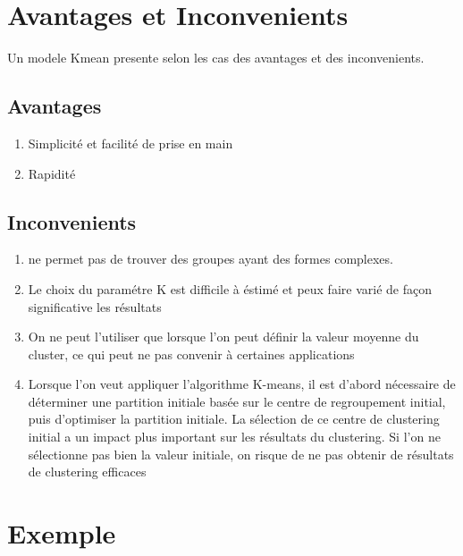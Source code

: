 \documentclass[a0,portrait]{a0poster}
\begin{document}
\section*{Avantages et Inconvenients}

Un modele Kmean presente selon les cas des avantages et des inconvenients.

\subsection*{Avantages}

\begin{enumerate}
    \item Simplicité et facilité de prise en main 
    \item Rapidité    
\end{enumerate}

\subsection*{Inconvenients}

\begin{enumerate}
    \item ne permet pas de trouver des groupes ayant des formes complexes.
    \item Le choix du paramétre K est difficile à éstimé et peux faire varié de façon significative les résultats 
    \item On ne peut l’utiliser que lorsque l’on peut définir la valeur moyenne du cluster, ce qui peut ne pas convenir à certaines applications
    \item Lorsque l’on veut appliquer l’algorithme K-means, il est d’abord nécessaire de déterminer une partition initiale basée sur le centre de regroupement initial, puis d’optimiser la partition initiale. La sélection de ce centre de clustering initial a un impact plus important sur les résultats du clustering. Si l’on ne sélectionne pas bien la valeur initiale, on risque de ne pas obtenir de résultats de clustering efficaces
\end{enumerate}


\section*{Exemple}
\end{document}
